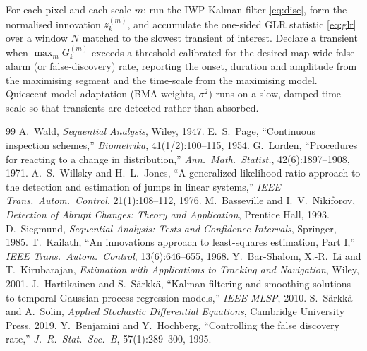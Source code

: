 \documentclass[11pt]{article}
\begin{document}
For each pixel and each scale $m$: run the IWP Kalman filter \eqref{eq:disc}, form the
normalised innovation $z_k^{(m)}$, and accumulate the one-sided GLR statistic
\eqref{eq:glr} over a window $N$ matched to the slowest transient of interest. Declare
a transient when $\max_m G_k^{(m)}$ exceeds a threshold calibrated for the desired
map-wide false-alarm (or false-discovery) rate, reporting the onset, duration and
amplitude from the maximising segment and the time-scale from the maximising model.
Quiescent-model adaptation (BMA weights, $\sigma^2$) runs on a slow, damped time-scale
so that transients are detected rather than absorbed.

\begin{thebibliography}{99}
\small
{} A.~Wald, \emph{Sequential Analysis}, Wiley, 1947.
 E.~S.~Page, ``Continuous inspection schemes,'' \emph{Biometrika}, 41(1/2):100--115, 1954.
 G.~Lorden, ``Procedures for reacting to a change in distribution,'' \emph{Ann.\ Math.\ Statist.}, 42(6):1897--1908, 1971.
 A.~S.~Willsky and H.~L.~Jones, ``A generalized likelihood ratio approach to the detection and estimation of jumps in linear systems,'' \emph{IEEE Trans.\ Autom.\ Control}, 21(1):108--112, 1976.
 M.~Basseville and I.~V.~Nikiforov, \emph{Detection of Abrupt Changes: Theory and Application}, Prentice Hall, 1993.
 D.~Siegmund, \emph{Sequential Analysis: Tests and Confidence Intervals}, Springer, 1985.
 T.~Kailath, ``An innovations approach to least-squares estimation, Part I,'' \emph{IEEE Trans.\ Autom.\ Control}, 13(6):646--655, 1968.
 Y.~Bar-Shalom, X.-R.~Li and T.~Kirubarajan, \emph{Estimation with Applications to Tracking and Navigation}, Wiley, 2001.
 J.~Hartikainen and S.~S\"arkk\"a, ``Kalman filtering and smoothing solutions to temporal Gaussian process regression models,'' \emph{IEEE MLSP}, 2010.
 S.~S\"arkk\"a and A.~Solin, \emph{Applied Stochastic Differential Equations}, Cambridge University Press, 2019.
 Y.~Benjamini and Y.~Hochberg, ``Controlling the false discovery rate,'' \emph{J.\ R.\ Stat.\ Soc.\ B}, 57(1):289--300, 1995.
\end{thebibliography}
\end{document}
